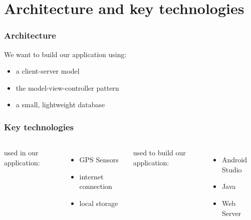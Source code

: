 \documentclass[aspectratio=169]{beamer}
\begin{document}
\section{Architecture and key technologies}
\begin{frame}
\frametitle{Architecture}
We want to build our application using:
	\begin{itemize}
		\item a client-server model 
		\item the model-view-controller pattern
		\item a small, lightweight database
	\end{itemize}
\end{frame}

\begin{frame}
\frametitle{Key technologies}
	\begin{columns}
used in our application:
  \begin{itemize}
		\item GPS Sensors 
		\item internet connection
		\item local storage
  \end{itemize}
    used to build our application:
  \begin{itemize}
		\item Android Studio
		\item Java
		\item Web Server
  \end{itemize}
\end{columns}
\end{frame}
\end{document}
